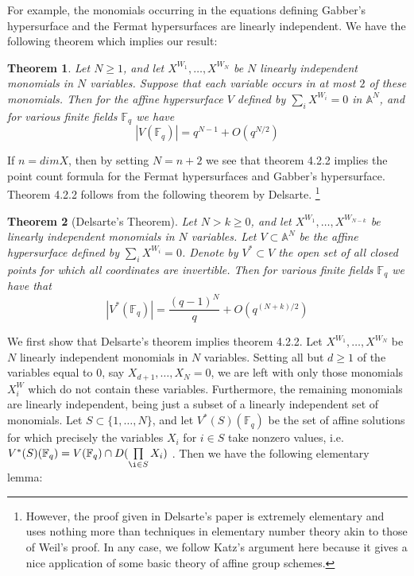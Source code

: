 \documentclass{ucbthesis}
\newtheorem{thm}{Theorem}[section]
\theoremstyle{definition}
\theoremstyle{theorem}
\begin{document}
For example, the monomials occurring in the equations defining Gabber's hypersurface and the Fermat hypersurfaces  are linearly independent. We have the following theorem which implies our result:

\begin{thm}
Let $N\geq 1$, and let $X^{W_{1}},\ldots,X^{W_{N}}$ be $N$ linearly independent monomials in $N$ variables. Suppose that each variable occurs in at most $2$ of these monomials. Then for the affine hypersurface $V$ defined by $\sum_{i}X^{W_{i}} = 0$ in $\mathbb{A}^{N}$, and for various finite fields $\mathbb{F}_{q}$ we have 
$$|V(\mathbb{F}_{q})| = q^{N-1} + O(q^{N/2})$$
\end{thm}

If $n=dim X$, then by setting $N=n+2$ we see that theorem 4.2.2 implies the point count formula for the Fermat hypersurfaces and Gabber's hypersurface. Theorem 4.2.2 follows from the following theorem by Delsarte. \footnote{However, the proof given in Delsarte's paper is extremely elementary and uses nothing more than techniques in elementary number theory akin to those of Weil's proof. In any case, we follow Katz's argument here because it gives a nice application of some basic theory of affine group schemes.}

\begin{thm}[Delsarte's Theorem]
Let $N>k\geq 0$, and let $X^{W_{1}},\ldots,X^{W_{N-k}}$ be linearly independent monomials in $N$ variables. Let $V\subset \mathbb{A}^{N}$ be the affine hypersurface defined by $\sum_{i}X^{W_{i}}=0$. Denote by $V^{*}\subset V$ the open set of all closed points for which all coordinates are invertible. Then for various finite fields $\mathbb{F}_{q}$ we have that 
$$|V^{*}(\mathbb{F}_{q})| = \frac{(q-1)^{N}}{q} + O(q^{(N+k)/2})$$ 
\end{thm}

We first show that Delsarte's theorem implies theorem 4.2.2. Let $X^{W_{1}},\ldots,X^{W_{N}}$ be $N$ linearly independent monomials in $N$ variables. Setting all but $d\geq 1$ of the variables equal to $0$, say $X_{d+1},\ldots, X_{N} = 0$, we are left with only those monomials $X^W_{i}$ which do not contain these variables. Furthermore, the remaining monomials are linearly independent, being just a subset of a linearly independent set of monomials. Let $S \subset \{1,\ldots, N\}$, and let $V^{*}(S)(\mathbb{F}_{q})$ be the set of affine solutions for which precisely the variables $X_{i}$ for $i\in S$ take nonzero values, i.e. $V^{*}(S)(\mathbb{F}_{q}) = V(\mathbb{F}_{q})\cap D(\prod\limits_{\i\in S}X_{i})$ . Then we have the following elementary lemma:
\end{document}
